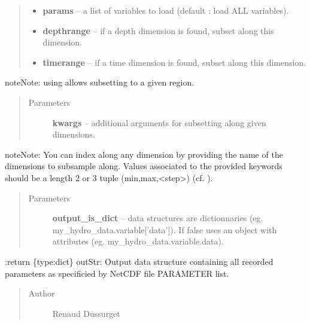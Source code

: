\documentclass[letterpaper,10pt,english]{sphinxmanual}
\begin{document}
\begin{fulllineitems}
\begin{fulllineitems}
\begin{quote}
\begin{description}
\begin{itemize}
\item {} 
\textbf{params} -- a list of variables to load (default : load ALL variables).

\item {} 
\textbf{depthrange} -- if a depth dimension is found, subset along this dimension.

\item {} 
\textbf{timerange} -- if a time dimension is found, subset along this dimension.

\end{itemize}

\end{description}\end{quote}

\begin{notice}{note}{Note:}
using  allows subsetting to a given region.
\end{notice}
\begin{quote}\begin{description}
\item[{Parameters}] \leavevmode
\textbf{kwargs} -- additional arguments for subsetting along given dimensions.

\end{description}\end{quote}

\begin{notice}{note}{Note:}
You can index along any dimension by providing the name of the dimensions to subsample along. Values associated to the provided keywords should be a length 2 or 3 tuple (min,max,\textless{}step\textgreater{}) (cf. ).
\end{notice}
\begin{quote}\begin{description}
\item[{Parameters}] \leavevmode
\textbf{output\_is\_dict} -- data structures are dictionnaries (eg. my\_hydro\_data.variable{[}'data'{]}). If false uses an object with attributes (eg. my\_hydro\_data.variable.data).

\end{description}\end{quote}

:return  \{type:dict\} outStr: Output data structure containing all recorded parameters as specificied by NetCDF file PARAMETER list.
\begin{quote}\begin{description}
\item[{Author }] \leavevmode
Renaud Dussurget


\end{description}
\end{quote}
\end{fulllineitems}
\end{fulllineitems}
\end{document}

